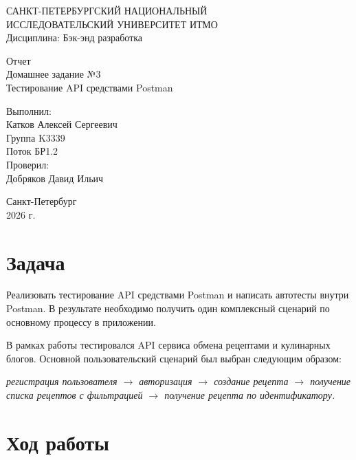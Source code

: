 \documentclass[12pt,a4paper]{article}
\begin{document}
\begin{titlepage}
\begin{center}
САНКТ-ПЕТЕРБУРГСКИЙ НАЦИОНАЛЬНЫЙ\\
ИССЛЕДОВАТЕЛЬСКИЙ УНИВЕРСИТЕТ ИТМО\\
\vspace{0.5cm}
Дисциплина: Бэк-энд разработка

\vspace{4cm}
{\Large Отчет}\\
\vspace{0.3cm}
{\large Домашнее задание №3}\\
\vspace{0.3cm}
{\large Тестирование API средствами Postman}

\vfill
\begin{flushright}
Выполнил:\\
Катков Алексей Сергеевич\\
Группа K3339\\
Поток БР1.2\\
\vspace{0.5cm}
Проверил:\\
Добряков Давид Ильич
\end{flushright}

\vfill
Санкт-Петербург\\
2026 г.
\end{center}
\end{titlepage}

\section*{Задача}

Реализовать тестирование API средствами Postman и написать автотесты внутри Postman. В результате необходимо получить один комплексный сценарий по основному процессу в приложении.

В рамках работы тестировался API сервиса обмена рецептами и кулинарных блогов. Основной пользовательский сценарий был выбран следующим образом:

\begin{center}
\textit{регистрация пользователя $\rightarrow$ авторизация $\rightarrow$ создание рецепта $\rightarrow$ получение списка рецептов с фильтрацией $\rightarrow$ получение рецепта по идентификатору.}
\end{center}

\section*{Ход работы}
\end{document}
